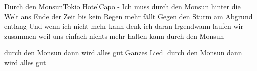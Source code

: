 \begin{song}{Durch den Monsun}{Tokio Hotel}{Capo -}
Ich muss durch den Monsun hinter die Welt
ans Ende der Zeit bis kein Regen mehr fällt
Gegen den Sturm am Abgrund entlang
Und wenn ich nicht mehr kann denk ich daran
Irgendwann laufen wir zusammen weil uns einfach nichts mehr halten kann
durch den Monsun

durch den Monsun
dann wird alles gut[Ganzes Lied] 
durch den Monsun
dann wird alles gut

\end{song}
